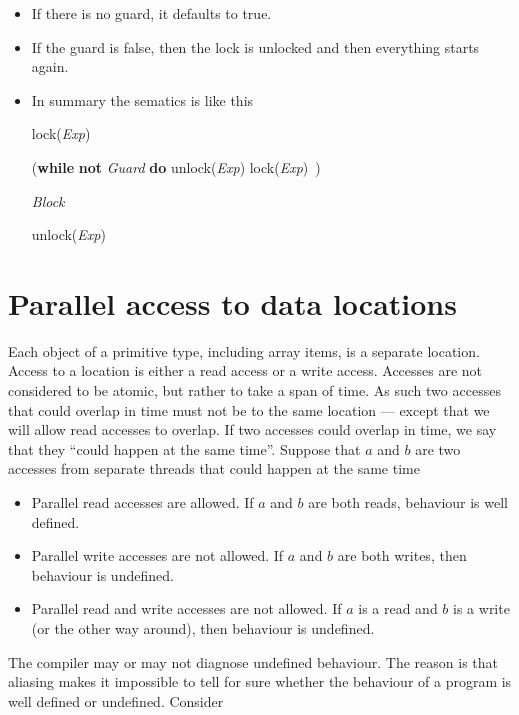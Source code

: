 \documentclass{article}%
\begin{document}
\begin{itemize}
\begin{itemize}
\begin{itemize}
\item If there is no guard, it defaults to true.

\item If the guard is false, then the lock is unlocked and then everything
starts again.

\item In summary the sematics is like this

\begin{code}
lock(\textit{Exp})

(\textbf{while} \textbf{not} \textit{Guard} \textbf{do} unlock(\textit{Exp})
lock(\textit{Exp})\ )

\textit{Block}

unlock(\textit{Exp})
\end{code}
\end{itemize}
\end{itemize}
\end{itemize}

\section{Parallel access to data locations}

Each object of a primitive type, including array items, is a separate
location. Access to a location is either a read access or a write access.
Accesses are not considered to be atomic, but rather to take a span of time.
As such two accesses that could overlap in time must not be to the same
location --- except that we will allow read accesses to overlap. If two
accesses could overlap in time, we say that they \textquotedblleft could
happen at the same time\textquotedblright. Suppose that $a$ and $b$ are two
accesses from separate threads that could happen at the same time

\begin{itemize}
\item Parallel read accesses are allowed. If $a$ and $b$ are both reads,
behaviour is well defined.

\item Parallel write accesses are not allowed. If $a$ and $b$ are both writes,
then behaviour is undefined.

\item Parallel read and write accesses are not allowed. If $a$ is a read and
$b$ is a write (or the other way around), then behaviour is undefined.
\end{itemize}

The compiler may or may not diagnose undefined behaviour. The reason is that
aliasing makes it impossible to tell for sure whether the behaviour of a
program is well defined or undefined. Consider
\end{document}
